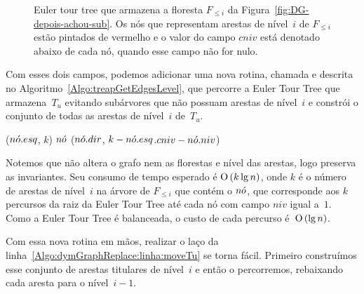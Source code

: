 \begin{figure}[htb]
\scalebox{.61}{
\centering
}
\caption{Euler tour tree que armazena a floresta $F_{\leqslant i}$ da Figura~\ref{fig:DG-depois-achou-sub}. Os nós que representam arestas de nível~$i$ de $F_{\leqslant i}$ estão pintados de vermelho e o valor do campo $cniv$ está denotado abaixo de cada nó, quando esse campo não for nulo.}
\label{fig:DG-TREAP-niv}
\end{figure}

Com esses dois campos, podemos adicionar uma nova rotina, chamada \treapGetEdgesLevel{} e descrita no Algoritmo~\ref{Algo:treapGetEdgesLevel}, que percorre a Euler Tour Tree que armazena~$T_u$ evitando subárvores que não possuam arestas de nível~$i$ e constrói o conjunto de todas as arestas de nível~$i$ de~$T_u$.

\begin{algorithm}
\caption{\treapGetEdgesLevel($\node$)}
\label{Algo:treapGetEdgesLevel}
\begin{algorithmic}[1]
\State \Return \Nil
\EndIf
{}
\State  \Return \treapGetEdgesLevel($n\acute{o}.esq$, $k$)
\EndIf
{}
\State  \Return $\node$
\EndIf
\State \Return \treapGetEdgesLevel($n\acute{o}.dir$, $k-n\acute{o}.esq$.$cniv-n\acute{o}.niv$)

\end{algorithmic}
\end{algorithm}

Notemos que \treapGetEdgesLevel{} não altera o grafo nem as florestas e nível das arestas, logo preserva as invariantes. Seu consumo de tempo esperado é $\text{O}\left(k \lg n\right)$, onde $k$ é o número de arestas de nível~$i$ na árvore de $F_{\leqslant i}$ que contém o $\node$, que corresponde aos $k$ percursos da raiz da Euler Tour Tree até cada nó com campo $niv$ igual a~$1$. Como a Euler Tour Tree é balanceada, o custo de cada percurso é~$\text{O}\left(\lg n\right)$.

Com essa nova rotina em mãos, realizar o laço da linha~\ref{Algo:dymGraphReplace:linha:moveTu} se torna fácil. Primeiro construímos esse conjunto de arestas titulares de nível~$i$ e então o percorremos, rebaixando cada aresta para o nível~$i-1$.

